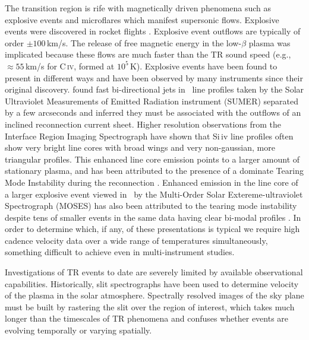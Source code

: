     The transition region is rife with magnetically driven phenomena such as explosive events \cite[e.g.,][]{dere1991} and microflares \citep{gontikakis2012} which manifest supersonic flows.
    Explosive events were discovered in rocket flights \citep{Dere1989}. 
    Explosive event outflows are typically of order $\pm 100$\,km/s. 
    The release of free magnetic energy in the low-$\beta$ plasma was implicated because these flows are much faster than the TR sound speed (e.g., $\approx55$\,km/s  for C\,\textsc{iv}, formed at $10^5$\,K).
    Explosive events have been found to present in different ways and have been observed by many instruments since their original discovery.
    \citet{innes1997} found fast bi-directional jets in \siiv \ line profiles taken by the Solar Ultraviolet Measurements of Emitted Radiation instrument (SUMER)  \citep{SUMER} separated by a few arcseconds and inferred they must be associated with the outflows of an inclined reconnection current sheet.
    Higher resolution observations from the Interface Region Imaging Spectrograph \citep[IRIS]{depontieu2014} have shown that Si\,{\sc iv} line profiles often show very bright line cores with broad wings and very non-gaussian, more triangular profiles.
    This enhanced line core emission points to a larger amount of stationary plasma, and has been attributed to the presence of a dominate Tearing Mode Instability during the reconnection \citep{Innes2015}.
    Enhanced emission in the line core of a larger explosive event viewed in \heii \ by the Multi-Order Solar Extereme-ultraviolet Spectrograph (MOSES)  has also been attributed to the tearing mode instability \citep{Fox10} despite tens of smaller events in the same data having clear bi-modal profiles \citep{Rust2019}.
    In order to determine which, if any, of these presentations is typical we require high cadence velocity data over a wide range of temperatures simultaneously, something difficult to achieve even in multi-instrument studies.
    
    
    Investigations of TR events to date are severely limited by available observational capabilities. 
    Historically, slit spectrographs have been used to determine velocity of the plasma in the solar atmosphere.   
    Spectrally resolved images of the sky plane must be built by rastering the slit over the region of interest, which takes much longer than the timescales of TR phenomena and confuses whether events are evolving temporally or varying spatially.  
    
